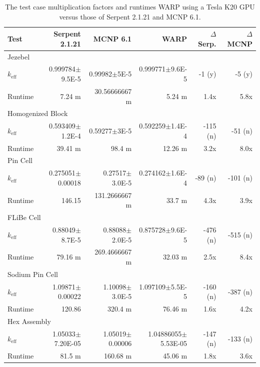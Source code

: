 \documentclass[preprint,12pt]{elsarticle}
\begin{document}
\begin{table}[h]
\centering
\caption{The test case multiplication factors and runtimes WARP using a Tesla K20 GPU versus those of Serpent 2.1.21 and MCNP 6.1.}
\label{results_table_k20}
\footnotesize
\begin{tabular}{| l | r | r | r || r | r |}
\hline
Test & Serpent 2.1.21 & MCNP 6.1 & WARP & $\Delta$ Serp. & $\Delta$ MCNP  \\
\hline
\hline
\multicolumn{6}{|l|}{Jezebel} \\
\hline
$k_\mathrm{eff}$ & 0.999784$\pm$9.5E-5 &		0.99982$\pm$5E-5 &		0.999771$\pm$9.6E-5	 &	-1 (y) &		-5 (y)\\
\hline
Runtime & 7.24	 m  &		30.56666667 m 	 &		5.24 m 	 &		1.4x	& 5.8x  \\
\hline
\hline
\multicolumn{6}{|l|}{Homogenized Block }\\
\hline
$k_\mathrm{eff}$ & 0.593409$\pm$1.2E-4 &		0.59277$\pm$3E-5 &		0.592259$\pm$1.4E-4 &		-115	(n) &	-51 (n)  \\
\hline
Runtime & 39.41 m 	 &		98.4 m  &		12.26 m 	 &		3.2x &		8.0x \\
\hline
\hline
\multicolumn{6}{|l|}{Pin Cell}\\
\hline
$k_\mathrm{eff}$ & 	 0.275051$\pm$0.00018&		0.27517$\pm$3.0E-5	 &	0.274162$\pm$1.6E-4	 &	-89 (n)	 &	-101 (n) \\
\hline
Runtime & 	146.15 &		131.2666667 m 	 &		33.7 m  &			4.3x	 &	3.9x \\
\hline
\hline
\multicolumn{6}{|l|}{FLiBe Cell}\\
\hline
$k_\mathrm{eff}$ & 0.88049$\pm$8.7E-5	 &	0.88088$\pm$2.0E-5	 &	0.875728$\pm$9.6E-5	 &	-476 (n)	 &	-515  (n)\\
\hline
Runtime & 79.16 m 	 &		269.4666667 m 		 &	32.03 m 	 &		2.5x	 &	8.4x \\
\hline
\hline
\multicolumn{6}{|l|}{Sodium Pin Cell}\\
\hline
$k_\mathrm{eff}$ & 	1.09871$\pm$0.00022 &		1.10098$\pm$3.0E-5	 &	1.097109$\pm$5.5E-5	 &	-160 (n)&		-387 (n)\\
\hline
Runtime & 	120.86	 &	320.4 m 	 &		76.46 m  &			1.6x &		4.2x \\
\hline
\hline
\multicolumn{6}{|l|}{Hex Assembly}\\
\hline
$k_\mathrm{eff}$ & 1.05033$\pm$7.20E-05	 &	1.05019$\pm$0.00006	 &	1.04886055$\pm$5.53E-05	 &	-147 (n) & -133 (n) \\
\hline
Runtime & 81.5 m 		 &	160.68 m 	 &		45.06 m  &			1.8x	 &	3.6x \\
\hline
\end{tabular}
\end{table}
\end{document}
